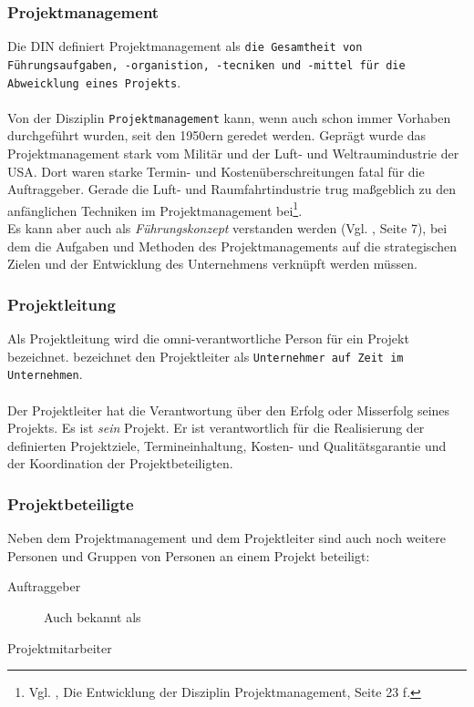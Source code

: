 \documentclass[12pt]{scrartcl}
\begin{document}
\subsubsection{Projektmanagement}
Die DIN definiert Projektmanagement als \texttt{die Gesamtheit von Führungsaufgaben, -organistion, -tecniken und -mittel für die Abweicklung eines Projekts}.\\
\\
Von der Disziplin \texttt{Projektmanagement} kann, wenn auch schon immer Vorhaben durchgeführt wurden, seit den 1950ern geredet werden. Geprägt wurde das Projektmanagement stark vom Militär und der Luft- und Weltraumindustrie der USA. Dort waren starke Termin- und Kostenüberschreitungen fatal für die Auftraggeber. Gerade die Luft- und Raumfahrtindustrie trug maßgeblich zu den anfänglichen Techniken im Projektmanagement bei\footnote{Vgl. \cite{proj_zum_erfolg_fuehren}, Die Entwicklung der Disziplin Projektmanagement, Seite 23 f.}. 
\\
Es kann aber auch als \textit{Führungskonzept} verstanden werden (Vgl. \cite{scriptPM}, Seite 7), bei dem die Aufgaben und Methoden des Projektmanagements auf die strategischen Zielen und der Entwicklung des Unternehmens verknüpft werden müssen. 

\subsubsection{Projektleitung}
Als Projektleitung wird die omni-verantwortliche Person für ein Projekt bezeichnet. \cite{proj_zum_erfolg_fuehren} bezeichnet den Projektleiter als \texttt{Unternehmer auf Zeit im Unternehmen}. \\
\\
Der Projektleiter hat die Verantwortung über den Erfolg oder Misserfolg seines Projekts. Es ist \textit{sein} Projekt. Er ist verantwortlich für die Realisierung der definierten Projektziele, Termineinhaltung, Kosten- und Qualitätsgarantie und der Koordination der Projektbeteiligten. 

\subsubsection{Projektbeteiligte}
Neben dem Projektmanagement und dem Projektleiter sind auch noch weitere Personen und Gruppen von Personen an einem Projekt beteiligt:
\begin{description}
    \item[Auftraggeber]
    Auch bekannt als 
    \item[Projektmitarbeiter]
\end{description}
\end{document}
